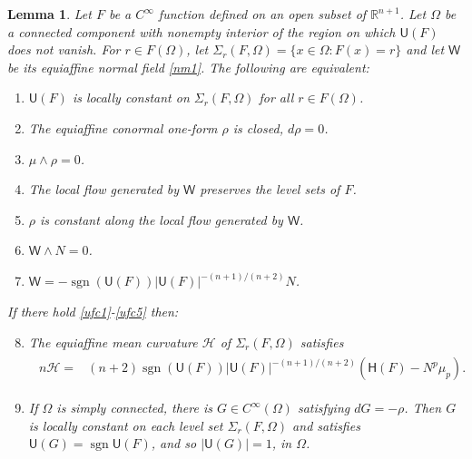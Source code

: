 \documentclass [leqno, 10pt]{amsart}
\newtheorem{lemma}[theorem]{Lemma}
\theoremstyle{definition}
\numberwithin{equation}{section}
\newcommand{\muf}{\mu}
\newcommand{\amc}{\mathcal{H}}
\newcommand{\Om}{\Omega}
\newcommand{\U}{\mathsf{U}}
\newcommand{\lc}{\Sigma}
\renewcommand{\H}{\mathsf{H}}
\newcommand{\nm}{\mathsf{W}}
\newcommand{\cinf}{C^{\infty}}
\newcommand{\sign}{\operatorname{sgn}}
\newcommand{\rea}{\mathbb R}
\begin{document}
\begin{lemma}\label{uflevellemma}
Let $F$ be a $\cinf$ function defined on an open subset of $\rea^{n+1}$. Let $\Omega$ be a connected component with nonempty interior of the region on which $\U(F)$ does not vanish. For $r \in F(\Om)$, let $\lc_{r}(F, \Omega) = \{x \in \Omega: F(x) = r\}$ and let $\nm$ be its equiaffine normal field \eqref{nm1}. The following are equivalent:
\begin{enumerate}
\item\label{ufc1} $\U(F)$ is locally constant on $\lc_{r}(F, \Om)$ for all $r \in F(\Om)$.
\item\label{ufc2} The equiaffine conormal one-form $\rho$ is closed, $d\rho = 0$.
\item\label{ufc2b} $\muf \wedge \rho = 0$.
\item\label{ufc3} The local flow generated by $\nm$ preserves the level sets of $F$.
\item\label{ufc3b} $\rho$ is constant along the local flow generated by $\nm$.
\item\label{ufc4} $\nm \wedge N = 0$.
\item\label{ufc5} $\nm = -\sign(\U(F))|\U(F)|^{-(n+1)/(n+2)}N$.
\end{enumerate}
If there hold \eqref{ufc1}-\eqref{ufc5} then:
\begin{enumerate}
\setcounter{enumi}{7}
\item The equiaffine mean curvature $\amc$ of $\lc_{r}(F, \Om)$ satisfies
\begin{align}\label{namc}
\begin{split}
n\amc =& (n+2)\sign(\U(F))|\U(F)|^{-(n+1)/(n+2)}(\H(F) - N^{p}\muf_{p}). 
\end{split}
\end{align}
\item \label{grho} If $\Om$ is simply connected, there is $G \in \cinf(\Om)$ satisfying $dG = -\rho$. Then $G$ is locally constant on each level set $\lc_{r}(F, \Om)$ and satisfies $\U(G) = \sign\U(F)$, and so $|\U(G)| = 1$, in $\Om$.
\end{enumerate}
\end{lemma}
\end{document}
